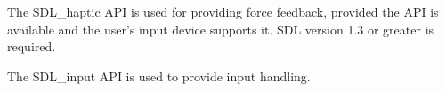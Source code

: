 

\startitemize[4]

The SDL_haptic API is used for providing force feedback, provided the API is available and the user's input device supports it. SDL version 1.3 or greater is required.


The SDL_input API is used to provide input handling.
\stopitemize


